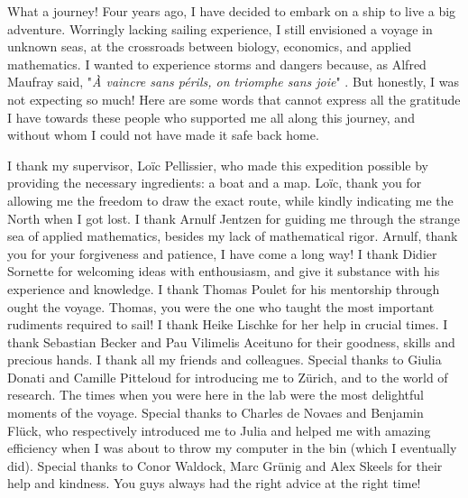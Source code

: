 %
\label{sec:acknowledgement}


What a journey!
% 
Four years ago, I have decided to embark on a ship to live a big adventure.
% 
Worringly lacking sailing experience, I still envisioned a voyage in unknown seas, at the crossroads between biology, economics, and applied mathematics.
% 
I wanted to experience storms and dangers because, as Alfred Maufray said, "\textit{À vaincre sans périls, on triomphe sans joie}" \citep{maufrais1997aventures}.
% 
But honestly, I was not expecting so much!
% 
Here are some words that cannot express all the gratitude I have towards these people who supported me all along this journey, and without whom I could not have made it safe back home.

I thank my supervisor, Loïc Pellissier, who made this expedition possible by providing the necessary ingredients: a boat and a map. Loïc, thank you for allowing me the freedom to draw the exact route, while kindly indicating me the North when I got lost.
% 
I thank Arnulf Jentzen for guiding me through the strange sea of applied mathematics, besides my lack of mathematical rigor. Arnulf, thank you for your forgiveness and patience, I have come a long way!
% 
I thank Didier Sornette for welcoming ideas with enthousiasm, and give it substance with his experience and knowledge.
% 
I thank Thomas Poulet for his mentorship through ought the voyage. Thomas, you were the one who taught the most important rudiments required to sail! 
% 
I thank Heike Lischke for her help in crucial times.
% 
I thank Sebastian Becker and Pau Vilimelis Aceituno for their goodness, skills and precious hands.
% 
I thank all my friends and colleagues. Special thanks to Giulia Donati and Camille Pitteloud for introducing me to Zürich, and to the world of research. The times when you were here in the lab were the most delightful moments of the voyage.
% 
Special thanks to Charles de Novaes and Benjamin Flück, who respectively introduced me to Julia and helped me with amazing efficiency when I was about to throw my computer in the bin (which I eventually did).
% 
Special thanks to Conor Waldock, Marc Grünig and Alex Skeels for their help and kindness. You guys always had the right advice at the right time!

